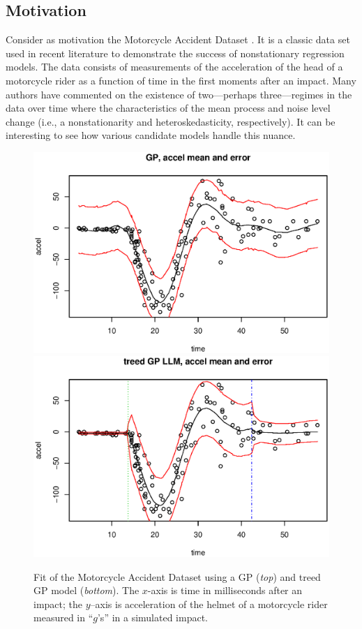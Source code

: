 \subsection*{Motivation}

Consider as motivation the Motorcycle Accident Dataset
\cite{silv:1985}.  It is a classic data set used in recent literature
\cite{rasm:ghah:nips:2002} to demonstrate the success of nonstationary
regression models.  The data consists of measurements of the
acceleration of the head of a motorcycle rider as a function of time
in the first moments after an impact.  Many authors have commented on
the existence of two---perhaps three---regimes in the data over time
where the characteristics of the mean process and noise level change
(i.e., a nonstationarity and heteroskedasticity, respectively).  It
can be interesting to see how various candidate models handle this
nuance.

\begin{figure}[ht!]
\centering
\includegraphics[trim=0 25 0 0]{motovate-bgp}
\includegraphics[trim=0 25 0 0]{motovate-btgp}
\caption{Fit of the Motorcycle Accident Dataset using a GP ({\em top})
  and treed GP model ({\em bottom}).  The $x$-axis is time in
  milliseconds after an impact; the $y$--axis is acceleration of the
  helmet of a motorcycle rider measured in ``$g$'s'' in a simulated
  impact.}
\label{f:motivate}
\end{figure}

